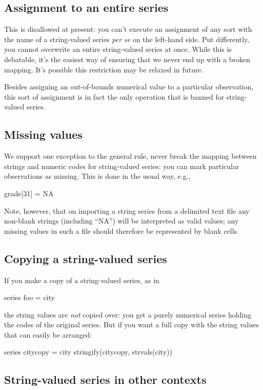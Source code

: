 \subsection{Assignment to an entire series}

This is disallowed at present: you can't execute an assignment of any
sort with the name of a string-valued series \textit{per se} on the
left-hand side. Put differently, you cannot overwrite an entire
string-valued series at once. While this is debatable, it's the
easiest way of ensuring that we never end up with a broken
mapping. It's possible this restriction may be relaxed in future.

Besides assigning an out-of-bounds numerical value to a particular
observation, this sort of assignment is in fact the only operation
that is banned for string-valued series.

\subsection{Missing values}

We support one exception to the general rule, never break the mapping
between strings and numeric codes for string-valued series: you can
mark particular observations as missing. This is done in the usual
way, e.g.,
\begin{code}
grade[31] = NA
\end{code}
Note, however, that on importing a string series from a delimited text
file any non-blank strings (including ``NA'') will be interpreted as
valid values; any missing values in such a file should therefore be
represented by blank cells.

\subsection{Copying a string-valued series}

If you make a copy of a string-valued series, as in
\begin{code}
series foo = city
\end{code}
the string values are \textit{not} copied over: you get a purely
numerical series holding the codes of the original series. But if you
want a full copy with the string values that can easily be arranged:
\begin{code}
series citycopy = city
stringify(citycopy, strvals(city))
\end{code}

\subsection{String-valued series in other contexts}

